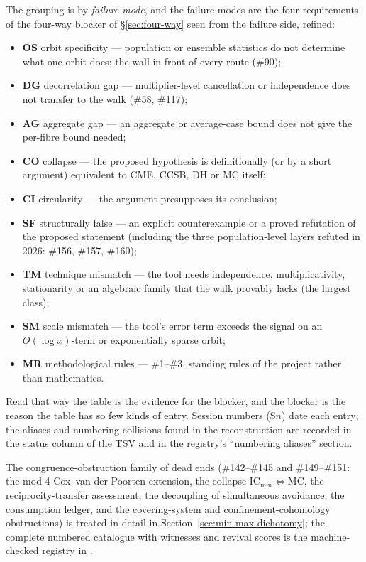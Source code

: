 The grouping is by \emph{failure mode}, and the failure modes are the
four requirements of the four-way blocker of \S\ref{sec:four-way} seen
from the failure side, refined:
\begin{itemize}[nosep]
\item \textbf{OS} orbit specificity --- population or ensemble statistics
  do not determine what one orbit does; the wall in front of every route
  (\#90);
\item \textbf{DG} decorrelation gap --- multiplier-level cancellation or
  independence does not transfer to the walk (\#58, \#117);
\item \textbf{AG} aggregate gap --- an aggregate or average-case bound
  does not give the per-fibre bound needed;
\item \textbf{CO} collapse --- the proposed hypothesis is definitionally
  (or by a short argument) equivalent to CME, CCSB, DH or MC itself;
\item \textbf{CI} circularity --- the argument presupposes its conclusion;
\item \textbf{SF} structurally false --- an explicit counterexample or a
  proved refutation of the proposed statement (including the three
  population-level layers refuted in 2026: \#156, \#157, \#160);
\item \textbf{TM} technique mismatch --- the tool needs independence,
  multiplicativity, stationarity or an algebraic family that the walk
  provably lacks (the largest class);
\item \textbf{SM} scale mismatch --- the tool's error term exceeds the
  signal on an $O(\log x)$-term or exponentially sparse orbit;
\item \textbf{MR} methodological rules --- \#1--\#3, standing rules of the
  project rather than mathematics.
\end{itemize}
Read that way the table is the evidence for the blocker, and the blocker
is the reason the table has so few kinds of entry.  Session numbers
(S$n$) date each entry; the aliases and numbering collisions found in the
reconstruction are recorded in the status column of the TSV and in the
registry's ``numbering aliases'' section.

\smallskip


\noindent The congruence-obstruction family of dead ends
(\#142--\#145 and \#149--\#151: the mod-4 Cox--van der Poorten
extension, the collapse $\mathrm{IC}_{\min} \Leftrightarrow \mathrm{MC}$,
the reciprocity-transfer assessment, the decoupling of simultaneous
avoidance, the consumption ledger, and the covering-system and
confinement-cohomology obstructions) is treated in detail in
Section~\ref{sec:min-max-dichotomy}; the complete numbered catalogue
with witnesses and revival scores is the machine-checked registry in
.

